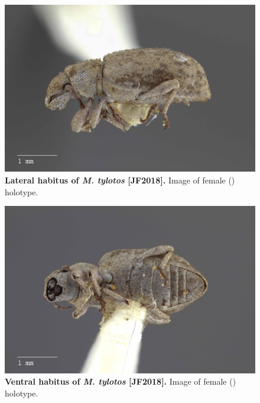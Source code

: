 \documentclass[fleqn,10pt,lineno]{wlpeerj} %
\begin{document}
\begin{figure}[h]
	\begin{sideways}
		\centering
		\includegraphics[height=\textwidth]{figure24.jpg}
	\end{sideways}
	\caption{\textbf{Lateral habitus of \textit{M. tylotos} [JF2018].} Image of female (\female) holotype.}
	\label{fig:tylotos_F_lateral}
\end{figure}

\begin{figure}[h]
	\begin{sideways}
		\centering
		\includegraphics[height=\textwidth]{figure25.jpg}
	\end{sideways}
	\caption{\textbf{Ventral habitus of \textit{M. tylotos} [JF2018].} Image of female (\female) holotype.}
	\label{fig:tylotos_F_ventral}
\end{figure}
\end{document}
